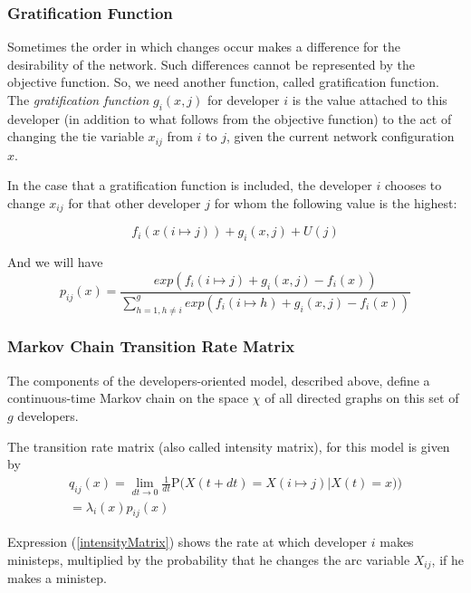 \documentclass[11pt]{report}
\begin{document}
\subsubsection{Gratification Function}
Sometimes the order in which changes occur makes a difference for the desirability of the network. Such differences cannot be represented by the objective function. So, we need another function, called gratification function. \\

The \textit{gratification function} $g_i(x,j)$ for developer $i$ is the value attached to this developer (in addition to what follows from the objective function) to the act of changing the tie variable $x_{ij}$ from $i$ to $j$, given the current network configuration $x$. 

In the case that a gratification function is included, the developer $i$ chooses to change $x_{ij}$ for that other developer $j$ for whom the following value \cite{Snijders2004} is the highest:

\begin{equation}
f_i(x(i \mapsto j)) + g_i(x, j) + U(j)
\end{equation} 

And we will have 
\begin{equation}
\label{ObjectiveFunctionWithGratification}
p_{ij}(x) = \frac{exp(f_i(i \mapsto j) + g_i(x, j) - f_i(x))}{\sum_{h=1, h \neq i}^{g} exp(f_i(i \mapsto h) + g_i(x, j) - f_i(x))}
\end{equation}

\subsubsection{Markov Chain Transition Rate Matrix}
The components of the developers-oriented model, described above, define a continuous-time Markov chain on the space $\chi$ of all directed graphs on this set of $g$ developers. 

The transition rate matrix (also called intensity matrix), for this model is given by
\begin{multline}
\label{intensityMatrix}
q_{ij}(x) = \lim_{dt \to 0} \frac{1}{dt} \mathrm {P} \big({X(t + dt) = X(i \mapsto j) | X(t) = x)}\big) \\ = \lambda_i(x) p_{ij}(x)
\end{multline}

Expression (\ref{intensityMatrix}) shows the rate at which developer $i$ makes ministeps, multiplied by the probability that he changes the arc variable $X_{ij}$, if he makes a ministep.\\
\end{document}
